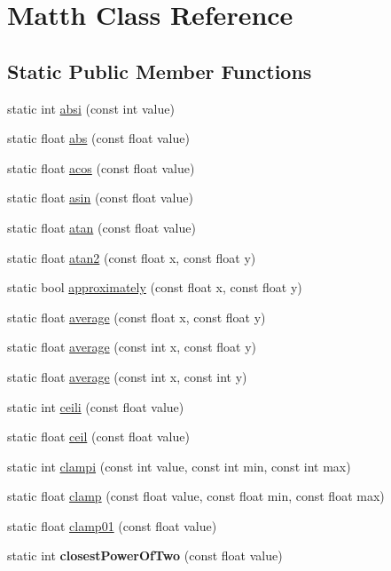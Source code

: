 \hypertarget{class_matth}{}\section{Matth Class Reference}
\label{class_matth}
\subsection*{Static Public Member Functions}
\begin{DoxyCompactItemize}
\item 
static int \hyperlink{class_matth_a900bf48507faeeb54a59213b62c00214}{absi} (const int value)
\item 
static float \hyperlink{class_matth_abfedd79c6ae1ce550784f17bf406da16}{abs} (const float value)
\item 
static float \hyperlink{class_matth_a6434126a05ec38e24a128bbc4e8938c4}{acos} (const float value)
\item 
static float \hyperlink{class_matth_a968adf68a678d9c56665dbabf246a6d4}{asin} (const float value)
\item 
static float \hyperlink{class_matth_a432ca1cc25b6e072129fbeb1a114b9f7}{atan} (const float value)
\item 
static float \hyperlink{class_matth_a5846ab2422a3d4f5968d5e0a8e135d0e}{atan2} (const float x, const float y)
\item 
static bool \hyperlink{class_matth_ad575860c76bd54d7ff8b8b889083a4d5}{approximately} (const float x, const float y)
\item 
static float \hyperlink{class_matth_a5cd315282b3dab72af5eaab3b5ade677}{average} (const float x, const float y)
\item 
static float \hyperlink{class_matth_a24f54a878a9c245b07293bcb942d76b4}{average} (const int x, const float y)
\item 
static float \hyperlink{class_matth_a7889849995bd56e78825a685fa3cf296}{average} (const int x, const int y)
\item 
static int \hyperlink{class_matth_a3b290e67eb4d4dcb2407edbeeed7822d}{ceili} (const float value)
\item 
static float \hyperlink{class_matth_a0f6e05dbb4d1b776420bc4a8c66e8eb4}{ceil} (const float value)
\item 
static int \hyperlink{class_matth_a81a58aa02e55ace490ff154b85a3c57e}{clampi} (const int value, const int min, const int max)
\item 
static float \hyperlink{class_matth_a5da791959fa3f433ae1746f3d6d5e592}{clamp} (const float value, const float min, const float max)
\item 
static float \hyperlink{class_matth_afe555e1bdec52d87807b172d1aa132d9}{clamp01} (const float value)
\item 
\hypertarget{class_matth_a9cb31c1d7333f316d5914ebfafc676de}{}static int {\bfseries closest\+Power\+Of\+Two} (const float value)\label{class_matth_a9cb31c1d7333f316d5914ebfafc676de}


\end{DoxyCompactItemize}

